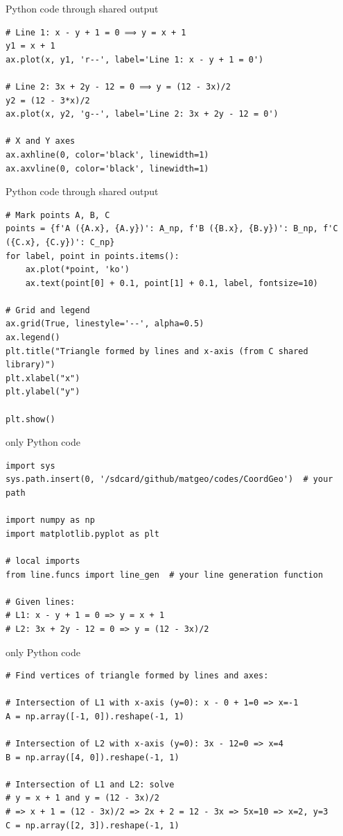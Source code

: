 \documentclass{beamer}
\begin{document}
\begin{frame}[fragile]{Python code through shared output}
\begin{lstlisting}
# Line 1: x - y + 1 = 0 ⟹ y = x + 1
y1 = x + 1
ax.plot(x, y1, 'r--', label='Line 1: x - y + 1 = 0')

# Line 2: 3x + 2y - 12 = 0 ⟹ y = (12 - 3x)/2
y2 = (12 - 3*x)/2
ax.plot(x, y2, 'g--', label='Line 2: 3x + 2y - 12 = 0')

# X and Y axes
ax.axhline(0, color='black', linewidth=1)
ax.axvline(0, color='black', linewidth=1)
 \end{lstlisting}
\end{frame}
\begin{frame}[fragile]{Python code through shared output}
\begin{lstlisting}
# Mark points A, B, C
points = {f'A ({A.x}, {A.y})': A_np, f'B ({B.x}, {B.y})': B_np, f'C ({C.x}, {C.y})': C_np}
for label, point in points.items():
    ax.plot(*point, 'ko')
    ax.text(point[0] + 0.1, point[1] + 0.1, label, fontsize=10)

# Grid and legend
ax.grid(True, linestyle='--', alpha=0.5)
ax.legend()
plt.title("Triangle formed by lines and x-axis (from C shared library)")
plt.xlabel("x")
plt.ylabel("y")

plt.show()

 \end{lstlisting}
\end{frame}
\begin{frame}[fragile]{only Python code }
\begin{lstlisting}
import sys
sys.path.insert(0, '/sdcard/github/matgeo/codes/CoordGeo')  # your path

import numpy as np
import matplotlib.pyplot as plt

# local imports
from line.funcs import line_gen  # your line generation function

# Given lines:
# L1: x - y + 1 = 0 => y = x + 1
# L2: 3x + 2y - 12 = 0 => y = (12 - 3x)/2
 \end{lstlisting}
\end{frame}
\begin{frame}[fragile]{only Python code }
\begin{lstlisting}
# Find vertices of triangle formed by lines and axes:

# Intersection of L1 with x-axis (y=0): x - 0 + 1=0 => x=-1
A = np.array([-1, 0]).reshape(-1, 1)

# Intersection of L2 with x-axis (y=0): 3x - 12=0 => x=4
B = np.array([4, 0]).reshape(-1, 1)

# Intersection of L1 and L2: solve
# y = x + 1 and y = (12 - 3x)/2
# => x + 1 = (12 - 3x)/2 => 2x + 2 = 12 - 3x => 5x=10 => x=2, y=3
C = np.array([2, 3]).reshape(-1, 1)
 \end{lstlisting}
\end{frame}
\end{document}
